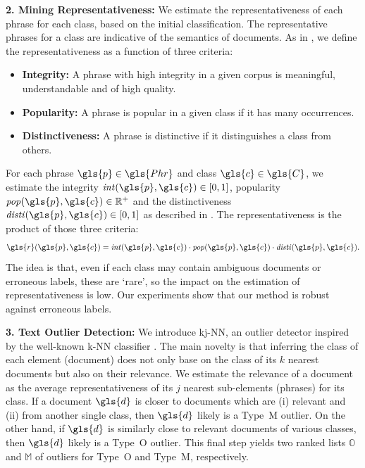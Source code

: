 \textbf{2. Mining Representativeness:} We estimate the representativeness of each phrase for each class, based on the initial classification. The representative phrases for a class are indicative of the semantics of documents. 
As in \cite{DBLP:journals/debu/TaoZYWCKVH16}, we define the representativeness as a function of three criteria: 
\begin{itemize}[noitemsep]
    \item \textbf{Integrity:} A phrase with high integrity in a given corpus is meaningful, understandable and of high quality. 
    \item \textbf{Popularity:} A phrase is popular in a given class if it has many occurrences. 
    \item \textbf{Distinctiveness:} A phrase is distinctive if it distinguishes a class from others.
\end{itemize}
For each phrase $\gls{p} \in \gls{Phr}$ and class $\gls{c} \in \gls{C}$, we estimate the integrity $\mathit{int}(\gls{p},\gls{c}) \in [0,1]$, popularity $\mathit{pop}(\gls{p},\gls{c}) \in \mathbb{R}^+$ and the distinctiveness $\mathit{disti}(\gls{p},\gls{c}) \in [0,1]$ as described in \cite{DBLP:series/synthesis/2019Zhang}. The representativeness is the product of those three criteria:
\begin{align}
    \gls{r}(\gls{p},\gls{c}) = \mathit{int}(\gls{p},\gls{c}) \cdot \mathit{pop}(\gls{p},\gls{c}) \cdot \mathit{disti}(\gls{p},\gls{c}).
\end{align}
The idea is that, even if each class may contain ambiguous documents or erroneous labels, these are `rare', so the impact on the estimation of representativeness is low. Our experiments show that our method is robust against %
erroneous labels.

\textbf{3. Text Outlier Detection:} We introduce \gls{kj-NN}, an outlier detector inspired by the well-known k-NN classifier \cite{fix1951discriminatory}. The main novelty is that inferring the class of each element (document) does not only base on the class of its $k$ nearest documents but also on their relevance. 
We estimate the relevance of a document as the average representativeness of its $j$ nearest sub-elements (phrases) for its class. 
If a document $\gls{d}$ is closer to documents which are (i) relevant and (ii) from another single class, then $\gls{d}$ likely is a Type~M outlier. 
On the other hand, if $\gls{d}$ is similarly close to relevant documents of various classes, then $\gls{d}$ likely is a Type~O outlier. This final step yields two ranked lists $\mathbb{O}$ and $\mathbb{M}$ of outliers for Type~O and Type~M, respectively.

